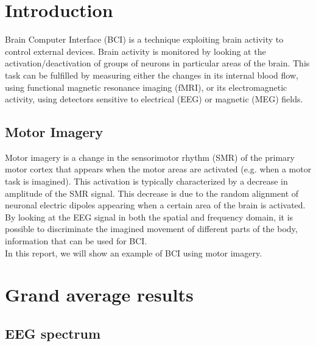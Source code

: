 \section{Introduction}
Brain Computer Interface (BCI) is a technique exploiting brain activity to control external devices.
Brain activity is monitored by looking at the activation/deactivation of groups of neurons in particular areas of the brain.
This task can be fulfilled by measuring either the changes in its internal blood flow, using functional magnetic resonance imaging (fMRI), or its electromagnetic activity, using detectors sensitive to electrical (EEG) or magnetic (MEG) fields.
\subsection{Motor Imagery}
Motor imagery is a change in the sensorimotor rhythm (SMR) of the primary motor cortex that appears when the motor areas are activated (e.g. when a motor task is imagined).
This activation is typically characterized by a decrease in amplitude of the SMR signal.
This decrease is due to the random alignment of neuronal electric dipoles appearing when a certain area of the brain is activated.
By looking at the EEG signal in both the spatial and frequency domain, it is possible to discriminate the imagined movement of different parts of the body, information that can be used for BCI. \\
In this report, we will show an example of BCI using motor imagery.

\section{Grand average results}
\subsection{EEG spectrum}

